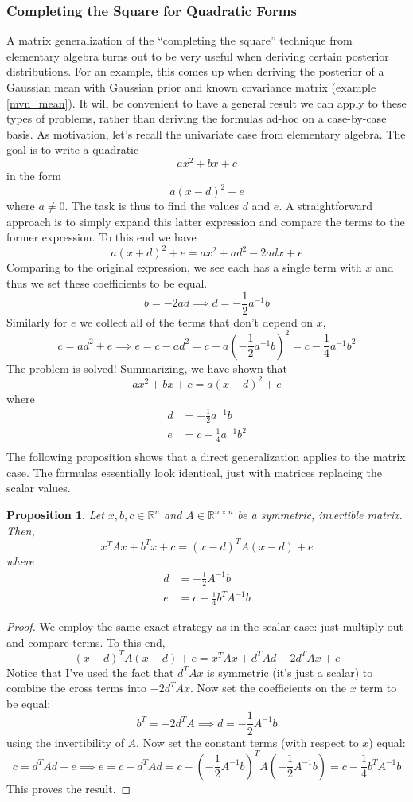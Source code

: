 \documentclass[12pt]{article}
\newcommand{\R}{\mathcal{R}}
\def\R{\mathbb{R}}
\newtheorem{prop}{Proposition}
\begin{document}
\subsubsection{Completing the Square for Quadratic Forms}
A matrix generalization of the ``completing the square'' technique from elementary algebra turns out to be very useful when deriving certain posterior distributions. 
For an example, this comes up when deriving the posterior of a Gaussian mean with Gaussian prior and known covariance matrix (example \ref{mvn_mean}). It will 
be convenient to have a general result we can apply to these types of problems, rather than deriving the formulas ad-hoc on a case-by-case basis. As motivation, 
let's recall the univariate case from elementary algebra. The goal is to write a quadratic
\[ax^2 + bx + c\]
in the form 
\[a(x - d)^2 + e\]
where $a \neq 0$. The task is thus to find the values $d$ and $e$. A straightforward approach is to simply expand this latter expression and compare the terms to the former expression. 
To this end we have 
\[a(x + d)^2 + e = ax^2 + ad^2 - 2adx + e\]
Comparing to the original expression, we see each has a single term with $x$ and thus we set these coefficients to be equal. 
\[b = -2ad \implies d = -\frac{1}{2}a^{-1}b\]
Similarly for $e$ we collect all of the terms that don't depend on $x$,
\[c = ad^2 + e \implies e = c - ad^2 = c - a\left(-\frac{1}{2}a^{-1}b\right)^2 = c - \frac{1}{4}a^{-1}b^2\]
The problem is solved! Summarizing, we have shown that 
\[ax^2 + bx + c = a(x - d)^2 + e\]
where 
\begin{align*}
d &= -\frac{1}{2}a^{-1}b \\
e &= c - \frac{1}{4}a^{-1}b^2 \\
\end{align*}
The following proposition shows that a direct generalization applies to the matrix case. The formulas essentially look identical, just with matrices replacing the scalar values. 
\begin{prop} \label{complete_the_square}
Let $x, b, c \in \R^n$ and $A \in \R^{n \times n}$ be a symmetric, invertible matrix. Then, 
\[x^T A x + b^T x + c = (x - d)^T A(x - d) + e\]
where 
\begin{align*}
d &= -\frac{1}{2}A^{-1}b \\
e &= c - \frac{1}{4}b^T A^{-1}b
\end{align*}
\end{prop}

\begin{proof}
We employ the same exact strategy as in the scalar case: just multiply out and compare terms. To this end, 
\[(x - d)^T A(x - d) + e = x^T A x + d^T Ad - 2d^T A x + e\]
Notice that I've used the fact that $d^T A x$ is symmetric (it's just a scalar) to combine the cross terms into $- 2d^T A x$. Now set the coefficients on the $x$ term to be equal: 
\[b^T = - 2d^T A \implies d = -\frac{1}{2}A^{-1}b\]
using the invertibility of $A$. Now set the constant terms (with respect to $x$) equal: 
\[c = d^T A d + e \implies e = c - d^T A d = c - \left(-\frac{1}{2}A^{-1}b\right)^T A \left(-\frac{1}{2}A^{-1}b\right) = c - \frac{1}{4}b^T A^{-1}b\]
This proves the result. 
\end{proof}
\end{document}
